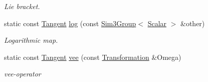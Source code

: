 \begin{DoxyCompactItemize}
\begin{DoxyCompactList}\small\item\em Lie bracket. \end{DoxyCompactList}\item 
static const \hyperlink{class_sophus_1_1_sim3_group_base_a0f61582b6d8fa46ecbb40d70c87b632c}{Tangent} \hyperlink{class_sophus_1_1_sim3_group_base_abfa0c8c65937d72a5de61ca77984229a}{log} (const \hyperlink{class_sophus_1_1_sim3_group}{Sim3\+Group}$<$ \hyperlink{class_sophus_1_1_sim3_group_base_abcf3d57b9fcc425bbc367a85a45a8092}{Scalar} $>$ \&other)
\begin{DoxyCompactList}\small\item\em Logarithmic map. \end{DoxyCompactList}\item 
static const \hyperlink{class_sophus_1_1_sim3_group_base_a0f61582b6d8fa46ecbb40d70c87b632c}{Tangent} \hyperlink{class_sophus_1_1_sim3_group_base_abbe5ee89ea9ffb584c5ee93ed61e42a3}{vee} (const \hyperlink{class_sophus_1_1_sim3_group_base_a93c8c564e3386709dc4cb2fc6d451dd8}{Transformation} \&Omega)
\begin{DoxyCompactList}\small\item\em vee-\/operator \end{DoxyCompactList}\end{DoxyCompactItemize}
